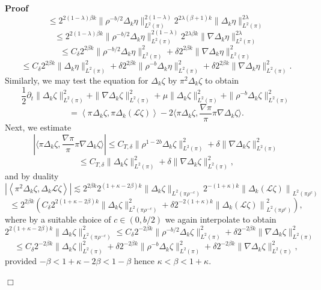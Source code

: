 \documentclass[a4paper,11pt]{article}
\newenvironment{proof}{\noindent\textbf{Proof\ }}{\hspace*{\fill}$\Box$\medskip}
\numberwithin{equation}{section}
\newcommand{\LL}{\mathscr{L}}
\newcommand{\8}{\infty}
\begin{document}
\begin{proof}
{\[     \]
\[
\leqslant 2^{2 ( 1-\lambda ) \beta k}  \| \rho^{- b/2} \Delta_k \eta \|^{2(1-\lambda)}_{ L^2 (\pi ) }
	2^{ 2 \lambda ( \beta+1 ) k}\|  \Delta_k \eta \|^{2\lambda}_{ L^2 (\pi ) }
\] 
\[
\leqslant 2^{2 ( 1-\lambda ) \beta k}  \| \rho^{- b/2} \Delta_k \eta \|^{2(1-\lambda)}_{ L^2 (\pi ) }
	2^{ 2 \lambda \beta k}\| \nabla \Delta_k \eta \|^{2\lambda}_{ L^2 (\pi ) }
\]     
\[
     \leqslant C_{\delta} 2^{2 \beta k} \| \rho^{- b / 2} \Delta_k
     \eta \|^2_{L^2 (\pi)} + \delta 2^{2 \beta k} \| \nabla \Delta_k \eta
     \|^2_{L^2 (\pi)} \]
  \[ \leqslant C_{\delta} 2^{2 \beta k} \| \Delta_k \eta \|^2_{L^2 (\pi)} +
     \delta 2^{2 \beta k} \| \rho^{- b} \Delta_k \eta \|^2_{L^2 (\pi)} +
     \delta 2^{2 \beta k} \| \nabla \Delta_k \eta \|_{L^2 (\pi)}^2 . \]}
  Similarly, we may test the equation for $\Delta_k \zeta$ by $\pi^2 \Delta_k
  \zeta$ to obtain
  \begin{equation}
    \frac{1}{2} \partial_t \| \Delta_k \zeta \|_{L^2 (\pi)}^2 + \| \nabla
    \Delta_k \zeta \|_{L^2 (\pi)}^2 + \mu \| \Delta_k \zeta \|_{L^2 (\pi)}^2 +
    \| \rho^{- b} \Delta_k \zeta \|_{L^2 (\pi)}^2 \label{eq:zeta}
  \end{equation}
  \[ = \left\langle \pi^{} \Delta_k \zeta, \pi \Delta_k \left( \LL \zeta
     \right) \right\rangle - 2 \langle \pi \Delta_k \zeta, \frac{\nabla
     \pi}{\pi} \pi \nabla \Delta_k \zeta \rangle . \]
  Next, we estimate
  \[ | \langle \pi \Delta_k \zeta, \frac{\nabla \pi}{\pi} \pi \nabla \Delta_k
     \zeta \rangle | \leqslant C_{T, \delta} \| \rho^{1 - 2 b} \Delta_k \zeta
     \|_{L^2 (\pi)}^2 + \delta \| \nabla \Delta_k \zeta \|_{L^2 (\pi)}^2 \]
  \[ \leqslant C_{T, \delta} \| \Delta_k \zeta \|_{L^2 (\pi)}^2 + \delta \|
    \nabla \Delta_k \zeta \|_{L^2 (\pi)}^2, \]
  and by duality
  \[ \left| \left\langle \pi^2 \Delta_k \zeta, \Delta_k \LL \zeta
     \right\rangle \right| \lesssim 2^{2 \beta k} 2^{(1 + \kappa - 2 \beta) k}
     \| \Delta_k \zeta \|_{L^2 (\pi \rho^{- c})} 2^{- (1 + \kappa) k} \left\|
     \Delta_k \left( \LL \zeta \right) \right\|_{L^2 (\pi \rho^c)} \]
  \[ \leqslant 2^{2 \beta k} \left( C_{\delta} 2^{2 (1 + \kappa - 2 \beta) k}
     \| \Delta_k \zeta \|^2_{L^2 (\pi \rho^{- c})} + \delta 2^{- 2 (1 +
     \kappa) k} \left\| \Delta_k \left( \LL \zeta \right) \right\|^2_{L^2 (\pi
     \rho^c)} \right), \]
  where by a suitable choice of $c \in (0, b / 2)$ we again interpolate to obtain
  \[ 2^{2 (1 + \kappa - 2 \beta) k} \| \Delta_k \zeta \|^2_{L^2 (\pi \rho^{-
     c})} \leqslant C_{\delta} 2^{- 2 \beta k} \| \rho^{- b / 2} \Delta_k
     \zeta \|^2_{L^2 (\pi)} + \delta 2^{- 2 \beta k} \| \nabla \Delta_k \zeta
     \|^2_{L^2 (\pi)} \]
  \[ \leqslant C_{\delta} 2^{- 2 \beta k} \| \Delta_k \zeta \|^2_{L^2
     (\pi)} + \delta 2^{- 2 \beta k} \| \rho^{- b} \Delta_k \zeta \|^2_{L^2
     (\pi)} + \delta 2^{- 2 \beta k} \| \nabla \Delta_k \zeta \|_{L^2
     (\pi)}^2, \]
  provided $- \beta < 1 + \kappa - 2 \beta < 1 - \beta$ hence $\kappa < \beta
  < 1 + \kappa$.
  

\end{proof}
\end{document}
